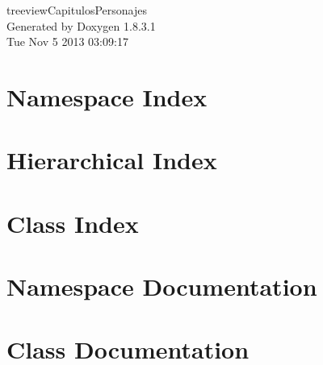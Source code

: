 \documentclass{book}
\begin{document}
\hypersetup{pageanchor=false,citecolor=blue}
\begin{titlepage}
\vspace*{7cm}
\begin{center}
{\Large treeview\-Capitulos\-Personajes }\\
\vspace*{1cm}
{\large Generated by Doxygen 1.8.3.1}\\
\vspace*{0.5cm}
{\small Tue Nov 5 2013 03:09:17}\\
\end{center}
\end{titlepage}
\clearemptydoublepage
{}
\tableofcontents
\clearemptydoublepage
{}
\hypersetup{pageanchor=true,citecolor=blue}
\chapter{Namespace Index}

\chapter{Hierarchical Index}

\chapter{Class Index}

\chapter{Namespace Documentation}

\chapter{Class Documentation}









\printindex
\end{document}

